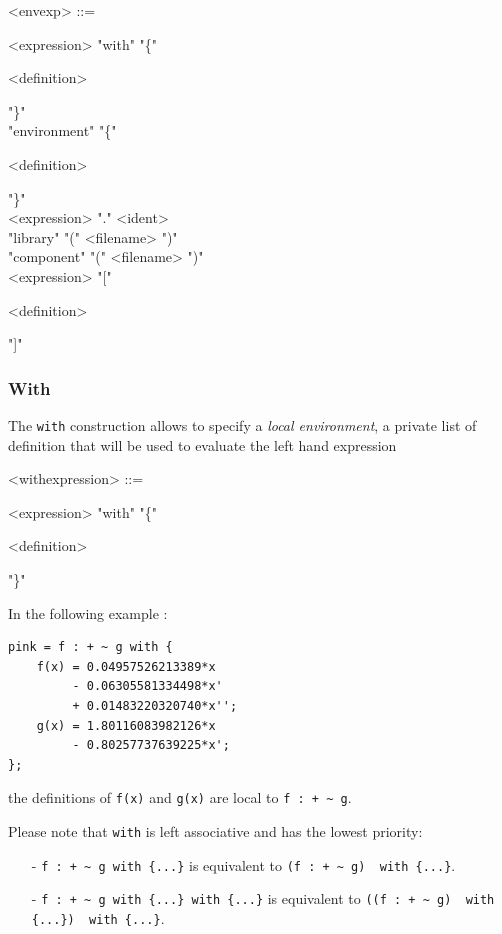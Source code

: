 \documentclass[a4paper,10pt]{book}
\begin{document}
\begin{grammar}
  <envexp> ::= 
  \begin{syntdiag}
    \begin{stack}
      <expression> "with" "\{"
        \begin{rep}
          <definition>
        \end{rep}
        "\}" \\ 
      "environment" "\{"
        \begin{rep}
          <definition>
        \end{rep}
        "\}" \\ 
      <expression> "." <ident> \\
      "library" "(" <filename> ")" \\
      "component" "(" <filename> ")" \\ 
      <expression> "["
        \begin{rep}
          <definition>
        \end{rep}
        "]"
    \end{stack}
  \end{syntdiag}
\end{grammar}

\subsubsection{With} 
The \lstinline'with' construction allows to specify a \textit{local environment}, a private list of definition that will be used to evaluate the left hand expression

\begin{grammar}
  <withexpression> ::= 
  \begin{syntdiag}
      <expression> "with" "\{"
        \begin{rep}
          <definition>
        \end{rep}
        "\}"
  \end{syntdiag}
\end{grammar}

In the following example :
\begin{lstlisting}
pink = f : + ~ g with {
	f(x) = 0.04957526213389*x 
		 - 0.06305581334498*x' 
         + 0.01483220320740*x'';
	g(x) = 1.80116083982126*x 
		 - 0.80257737639225*x';
};
\end{lstlisting}
the definitions of \lstinline'f(x)' and \lstinline'g(x)' are local to \lstinline'f : + ~ g'.

Please note that \lstinline'with' is left associative and has the lowest priority:
\begin{itemize} 
\item[-] \lstinline'f : + ~ g with {...}' is equivalent to \lstinline'(f : + ~ g)  with {...}'. 
\item[-] \lstinline'f : + ~ g with {...} with {...}' is equivalent to \lstinline'((f : + ~ g)  with {...})  with {...}'. 
\end{itemize}
\end{document}
